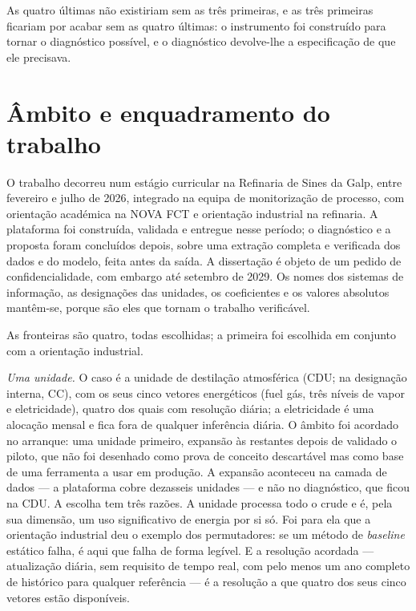 As quatro últimas não existiriam sem as três primeiras, e as três
primeiras ficariam por acabar sem as quatro últimas: o instrumento foi
construído para tornar o diagnóstico possível, e o diagnóstico
devolve-lhe a especificação de que ele precisava.

\section{Âmbito e enquadramento do trabalho}
\label{sec:ambito}

O trabalho decorreu num estágio curricular na Refinaria de Sines da
Galp, entre fevereiro e julho de 2026, integrado na equipa de
monitorização de processo, com orientação académica na NOVA FCT e
orientação industrial na refinaria. A
plataforma foi construída, validada e entregue nesse período; o
diagnóstico e a proposta foram concluídos depois, sobre uma extração
completa e verificada dos dados e do modelo, feita antes da saída. A
dissertação é objeto de um pedido de confidencialidade, com embargo até
setembro de 2029. Os nomes dos sistemas de informação, as designações
das unidades, os coeficientes e os valores absolutos mantêm-se, porque
são eles que tornam o trabalho verificável.

As fronteiras são quatro, todas escolhidas; a primeira foi escolhida em
conjunto com a orientação industrial.

\emph{Uma unidade.} O caso é a unidade de destilação atmosférica (CDU;
na designação interna, CC), com os seus cinco vetores energéticos (fuel
gás, três níveis de vapor e eletricidade), quatro dos quais com
resolução diária; a eletricidade é uma alocação mensal e fica fora de
qualquer inferência diária. O âmbito foi acordado no arranque: uma
unidade primeiro, expansão às restantes depois de validado o piloto, que
não foi desenhado como prova de conceito descartável mas como base de
uma ferramenta a usar em produção. A expansão aconteceu na camada de
dados --- a plataforma cobre dezasseis unidades --- e não no diagnóstico,
que ficou na CDU. A escolha tem três razões. A unidade processa todo o
crude e é, pela sua dimensão, um uso significativo de energia por si
só. Foi para ela que a orientação industrial deu o exemplo dos
permutadores: se um método de \emph{baseline} estático falha, é aqui que
falha de forma legível. E a resolução acordada --- atualização diária,
sem requisito de tempo real, com pelo menos um ano completo de histórico
para qualquer referência --- é a resolução a que quatro dos seus cinco
vetores estão disponíveis.

